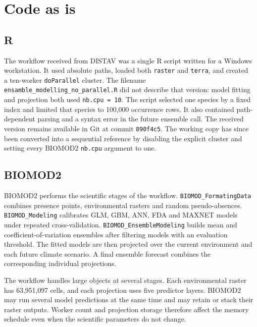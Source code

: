 \chapter{Code as is}

\section{R}


The workflow received from DISTAV was a single R script written for a Windows workstation. It used absolute paths, loaded both \texttt{raster} and \texttt{terra}, and created a ten-worker \texttt{doParallel} cluster. The filename \nolinkurl{ensamble_modelling_no_parallel.R} did not describe that version: model fitting and projection both used \texttt{nb.cpu = 10}. The script selected one species by a fixed index and limited that species to 100,000 occurrence rows. It also contained path-dependent parsing and a syntax error in the future ensemble call. The received version remains available in Git at commit \texttt{890f4c5}. The working copy has since been converted into a sequential reference by disabling the explicit cluster and setting every BIOMOD2 \texttt{nb.cpu} argument to one.

\section{BIOMOD2}

BIOMOD2 performs the scientific stages of the workflow. \nolinkurl{BIOMOD_FormatingData} combines presence points, environmental rasters and random pseudo-absences. \nolinkurl{BIOMOD_Modeling} calibrates GLM, GBM, ANN, FDA and MAXNET models under repeated cross-validation. \nolinkurl{BIOMOD_EnsembleModeling} builds mean and coefficient-of-variation ensembles after filtering models with an evaluation threshold. The fitted models are then projected over the current environment and each future climate scenario. A final ensemble forecast combines the corresponding individual projections.

The workflow handles large objects at several stages. Each environmental raster has 63,951,097 cells, and each projection uses five predictor layers. BIOMOD2 may run several model predictions at the same time and may retain or stack their raster outputs. Worker count and projection storage therefore affect the memory schedule even when the scientific parameters do not change.

